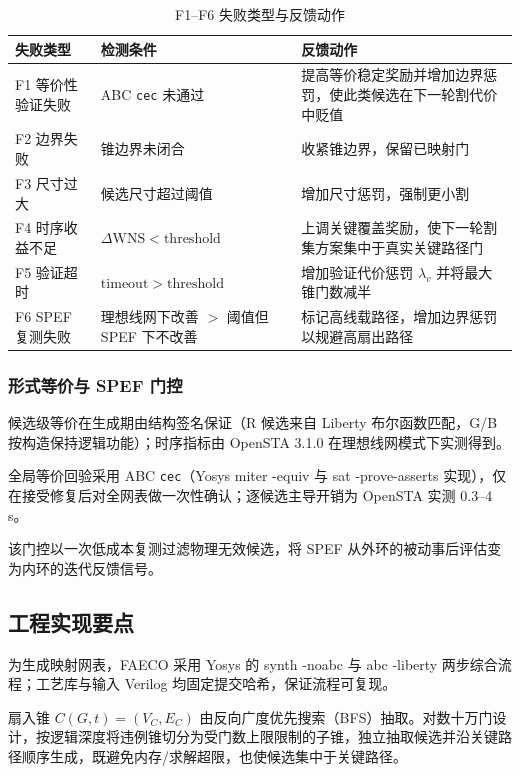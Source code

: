 \documentclass[journal]{IEEEtran}
\begin{document}
\begin{table}[!t]
\centering
\caption{F1--F6 失败类型与反馈动作}
\label{tab:failures}
\scriptsize
\setlength{\tabcolsep}{2pt}
\begin{tabular}{p{2.0cm}p{3.2cm}p{2.9cm}}
\toprule
\textbf{失败类型} & \textbf{检测条件} & \textbf{反馈动作} \\
\midrule
F1 等价性验证失败 & ABC \texttt{cec} 未通过 & 提高等价稳定奖励并增加边界惩罚，使此类候选在下一轮割代价中贬值 \\
F2 边界失败 & 锥边界未闭合 & 收紧锥边界，保留已映射门 \\
F3 尺寸过大 & 候选尺寸超过阈值 & 增加尺寸惩罚，强制更小割 \\
F4 时序收益不足 & $\Delta\mathrm{WNS} < \mathrm{threshold}$ & 上调关键覆盖奖励，使下一轮割集方案集中于真实关键路径门 \\
F5 验证超时 & $\mathrm{timeout} > \mathrm{threshold}$ & 增加验证代价惩罚 $\lambda_v$ 并将最大锥门数减半 \\
F6 SPEF 复测失败 & 理想线网下改善 $>$ 阈值但 SPEF 下不改善 & 标记高线载路径，增加边界惩罚以规避高扇出路径 \\
\bottomrule
\end{tabular}
\end{table}

\subsubsection{形式等价与 SPEF 门控}
候选级等价在生成期由结构签名保证（R 候选来自 Liberty 布尔函数匹配，G/B 按构造保持逻辑功能）；时序指标由 OpenSTA 3.1.0 在理想线网模式下实测得到。

全局等价回验采用 ABC \texttt{cec}（Yosys miter -equiv 与 sat -prove-asserts 实现），仅在接受修复后对全网表做一次性确认；逐候选主导开销为 OpenSTA 实测 $0.3$--$4\,$s。

该门控以一次低成本复测过滤物理无效候选，将 SPEF 从外环的被动事后评估变为内环的迭代反馈信号。

\subsection{工程实现要点}\label{sec:impl}

为生成映射网表，FAECO 采用 Yosys 的 synth -noabc 与 abc -liberty 两步综合流程；工艺库与输入 Verilog 均固定提交哈希，保证流程可复现。

扇入锥 $C(G, t) = (V_C, E_C)$ 由反向广度优先搜索（BFS）抽取。对数十万门设计，按逻辑深度将违例锥切分为受门数上限限制的子锥，独立抽取候选并沿关键路径顺序生成，既避免内存/求解超限，也使候选集中于关键路径。
\end{document}
